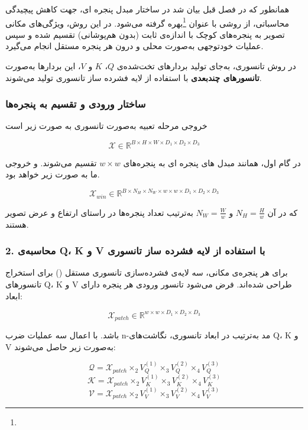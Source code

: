 همانطور که در فصل قبل بیان شد در ساختار مبدل پنجره ای، جهت کاهش پیچیدگی محاسباتی، از روشی با عنوان  \footnote{}بهره گرفته می‌شود. در این روش، ویژگی‌های مکانی تصویر به پنجره‌های کوچک با اندازه‌ی ثابت (بدون هم‌پوشانی) تقسیم شده و سپس عملیات  خود‌توجهی به‌صورت محلی و درون هر پنجره مستقل انجام می‌گیرد.

در روش تانسوری، به‌جای تولید بردارهای تخت‌شده‌ی $Q$، $K$ و $V$، این بردارها به‌صورت \textbf{تانسورهای چندبعدی} با استفاده از لایه فشرده ساز تانسوری تولید می‌شوند.

\subsubsection*{ ساختار ورودی و تقسیم به پنجره‌ها}

خروجی مرحله تعبیه  به‌صورت تانسوری به صورت زیر است 

\[
\mathcal{X} \in \mathbb{R}^{B \times H \times W \times D_1 \times D_2 \times D_3}
\]



در گام اول، همانند مبدل های پنجره ای به پنجره‌های $w \times w$ تقسیم می‌شوند. و خروجی ما به صورت  زیر خواهد بود.

\[
\mathcal{X}_{win} \in \mathbb{R}^{B \times N_H \times N_W \times w \times w \times D_1 \times D_2 \times D_3}
\]

که در آن $N_H = \frac{H}{w}$ و $N_W = \frac{W}{w}$ به‌ترتیب تعداد پنجره‌ها در راستای ارتفاع و عرض تصویر هستند.

\subsubsection*{2. محاسبه‌ی Q، K و V با استفاده از لایه فشرده ساز تانسوری}

برای هر پنجره‌ی مکانی، سه لایه‌ی فشرده‌سازی تانسوری مستقل () برای استخراج تانسورهای Q، K و V طراحی شده‌اند. فرض می‌شود تانسور ورودی هر پنجره دارای ابعاد:

\[
\mathcal{X}_{patch} \in \mathbb{R}^{w \times w \times D_1 \times D_2 \times D_3}
\]

باشد. با اعمال سه عملیات ضرب n-مد به‌ترتیب در ابعاد تانسوری، نگاشت‌های Q، K و V به‌صورت زیر حاصل می‌شوند:

\[
\mathcal{Q} = \mathcal{X}_{patch} \times_2 V_Q^{(1)} \times_3 V_Q^{(2)} \times_4 V_Q^{(3)}
\]
\[
\mathcal{K} = \mathcal{X}_{patch} \times_2 V_K^{(1)} \times_3 V_K^{(2)} \times_4 V_K^{(3)}
\]
\[
\mathcal{V} = \mathcal{X}_{patch} \times_2 V_V^{(1)} \times_3 V_V^{(2)} \times_4 V_V^{(3)}
\]


